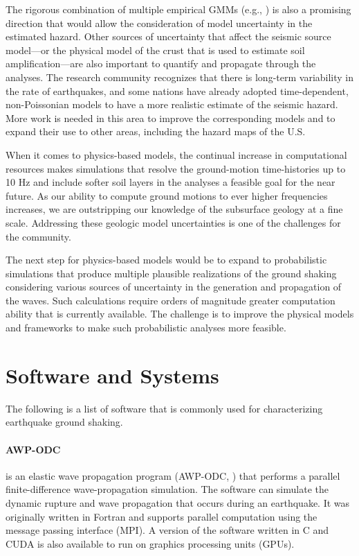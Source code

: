 The rigorous combination of multiple empirical GMMs (e.g., \cite{goulet2017ngaeast}) is also a promising direction that would allow the consideration of model uncertainty in the estimated hazard. Other sources of uncertainty that affect the seismic source model---or the physical model of the crust that is used to estimate soil amplification---are also important to quantify and propagate through the analyses. 
The research community recognizes that there is long-term variability in the rate of earthquakes, and some nations have already adopted time-dependent, non-Poissonian models to have a more realistic estimate of the seismic hazard. More work is needed in this area to improve the corresponding models and to expand their use to other areas, including the hazard maps of the U.S.

When it comes to physics-based models, the continual increase in computational resources makes simulations that resolve the ground-motion time-histories up to 10 Hz and include softer soil layers in the analyses a feasible goal for the near future. As our ability to compute ground motions to ever higher frequencies increases, we are outstripping our knowledge of the subsurface geology at a fine scale. Addressing these geologic model uncertainties is one of the challenges for the community.

The next step for physics-based models would be to expand to probabilistic simulations that produce multiple plausible realizations of the ground shaking considering various sources of uncertainty in the generation and propagation of the waves. Such calculations require orders of magnitude greater computation ability that is currently available. The challenge is to improve the physical models and frameworks to make such probabilistic analyses more feasible.

\section{Software and Systems}
\label{sec:eq_shake_tools}

The following is a list of software that is commonly used for characterizing earthquake ground shaking.

\paragraph{AWP-ODC}  is an elastic wave propagation program (AWP-ODC, \cite{cui2010scalable}) that performs a parallel finite-difference wave-propagation simulation. The software can simulate the dynamic rupture and wave propagation that occurs during an earthquake. It was originally written in Fortran and supports parallel computation using the message passing interface (MPI). A version of the software written in C and CUDA is also available to run on graphics processing units (GPUs).

